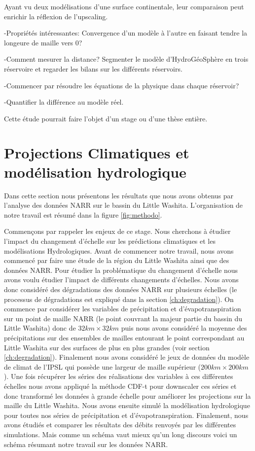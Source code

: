 \documentclass[a4paper,11pt]{article}
\numberwithin{equation}{section}
\begin{document}
Ayant vu deux modélisations d'une surface continentale, leur comparaison peut enrichir la réflexion de l'upscaling. 

-Propriétés intéressantes: Convergence d'un modèle à l'autre en faisant tendre la longeure de maille vers 0?

-Comment mesurer la distance? Segmenter le modèle d'HydroGéoSphère en trois réservoire et regarder les bilans sur les différents réservoirs.

-Commencer par résoudre les équations de la physique dans chaque réservoir?

-Quantifier la différence au modèle réel.

Cette étude pourrait faire l'objet d'un stage ou d'une thèse entière. 


\newpage
\section{Projections Climatiques et modélisation hydrologique}
\label{ch:Proj-climatique-mod-hydro}

Dans cette section nous présentons les résultats que nous avons obtenus par l'analyse des données NARR sur le bassin du Little Washita. L'organisation de notre travail est résumé dans la figure \ref{fig:methodo}.

Commençons par rappeler les enjeux de ce stage. Nous cherchons à étudier l'impact du changement d'échelle sur les prédictions climatiques et les modélisations Hydrologiques. Avant de commencer notre travail, nous avons commencé par faire une étude de la région du Little Washita ainsi que des données NARR. Pour étudier la problématique du changement d'échelle nous avons voulu étudier l'impact de différents changements d'échelles. Nous avons donc considéré des dégradations des données NARR sur plusieurs échelles (le processus de dégradations est expliqué dans la section \ref{ch:degradation}). On commence par considérer les variables de précipitation et d'évapotranspiration sur un point de maille NARR (le point couvrant la majeur partie du bassin du Little Washita) donc de $32km\times 32km$ puis nous avons considéré la moyenne des précipitations sur des ensembles de mailles entourant le point correspondant au Little Washita sur des surfaces de plus en plus grandes (voir section \ref{ch:degradation}). Finalement nous avons considéré le jeux de données du modèle de climat de l'IPSL qui possède une largeur de maille supérieur ($200km\times 200km$). Une fois récupérer les séries des réalisations des variables à ces différentes échelles nous avons appliqué la méthode CDF-t pour downscaler ces séries et donc transformé les données à grande échelle pour améliorer les projections sur la maille du Little Washita. Nous avons ensuite simulé la modélisation hydrologique pour toutes nos séries de précipitation et d'évapotranspiration. Finalement, nous avons étudiés et comparer les résultats des débits renvoyés par les différentes simulations. Mais comme un schéma vaut mieux qu'un long discours voici un schéma résumant notre travail sur les données NARR.
\end{document}
